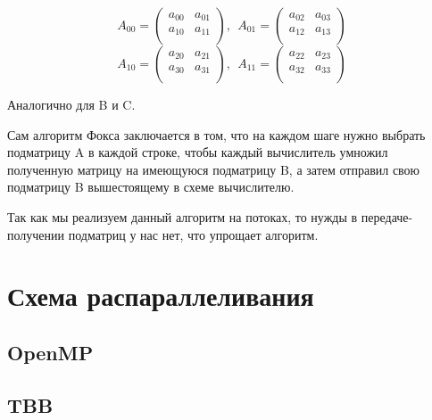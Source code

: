 \documentclass{report}
\begin{document}
 \[ A_{00}= \left( \begin{matrix}
a_{00}  &  a_{01}\\
a_{10}  &  a_{11}\\
\end{matrix}
 \right) ,~~A_{01}= \left( \begin{matrix}
a_{02}  &   a_{03}\\
a_{12}  &   a_{13}\\
\end{matrix}
 \right)  \]  \[ A_{10}= \left( \begin{matrix}
a_{20}  &  a_{21}\\
a_{30}  &  a_{31}\\
\end{matrix}
 \right) ,~~A_{11}= \left( \begin{matrix}
a_{22}  &  a_{23}\\
a_{32}  &  a_{33}\\
\end{matrix}
 \right)  \] \par


\vspace{\baselineskip}
 Аналогично для B и C.\par

Сам алгоритм Фокса заключается в том, что на каждом шаге нужно выбрать подматрицу A в каждой строке, чтобы каждый вычислитель умножил полученную матрицу на имеющуюся подматрицу B, а затем отправил свою подматрицу B вышестоящему в схеме вычислителю.\par

Так как мы реализуем данный алгоритм на потоках, то нужды в передаче-получении подматриц у нас нет, что упрощает алгоритм.\par
\newpage

\section*{Схема распараллеливания}

\subsection{OpenMP}
\newpage

\subsection{TBB}
\newpage
\end{document}

